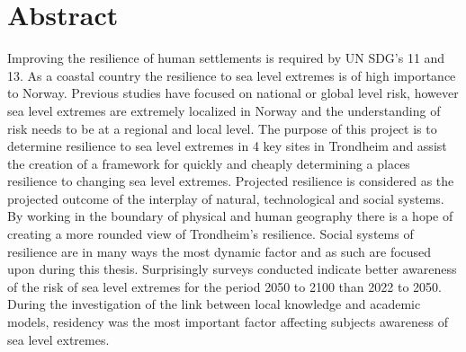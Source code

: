 

\section{Abstract}

Improving the resilience of human settlements is required by UN SDG's 11 and 13. As a coastal country the resilience to sea level extremes is of high importance to Norway. Previous studies have focused on national or global level risk, however sea level extremes are extremely localized in Norway and the understanding of risk needs to be at a regional and local level. The purpose of this project is to determine resilience to sea level extremes in 4 key sites in Trondheim and assist the creation of a framework for quickly and cheaply determining a places resilience to changing sea level extremes. Projected resilience is considered as the projected outcome of the interplay of natural, technological and social systems. By working in the boundary of physical and human geography there is a hope of creating a more rounded view of Trondheim's resilience. Social systems of resilience are in many ways the most dynamic factor and as such are focused upon during this thesis. Surprisingly surveys conducted indicate better awareness of the risk of sea level extremes for the period 2050 to 2100 than 2022 to 2050. During the investigation of the link between local knowledge and academic models, residency was the most important factor affecting subjects awareness of sea level extremes.   



